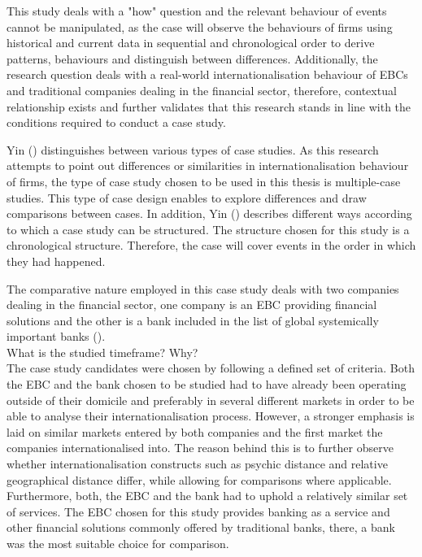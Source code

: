 \documentclass[11pt,a4paper]{article}
\begin{document}
{{This study deals with a "how" question and the relevant behaviour of events cannot be manipulated, as the case will observe the behaviours of firms using historical and current data in sequential and chronological order to derive patterns, behaviours and distinguish between differences. Additionally, the research question deals with a real-world internationalisation behaviour of EBCs and traditional companies dealing in the financial sector, therefore, contextual relationship exists and further validates that this research stands in line with the conditions required to conduct a case study. \par
Yin (\citeyear{yinCaseStudyResearch2017}) distinguishes between various types of case studies. As this research attempts to point out differences or similarities in internationalisation behaviour of firms, the type of case study chosen to be used in this thesis is multiple-case studies. This type of case design enables to explore differences and draw comparisons between cases. In addition, Yin (\citeyear{yinCaseStudyResearch2017}) describes different ways according to which a case study can be structured. The structure chosen for this study is a chronological structure. Therefore, the case will cover events in the order in which they had happened.  \par
The comparative nature employed in this case study deals with two companies dealing in the financial sector, one company is an EBC providing financial solutions and the other is a bank included in the list of global systemically important banks (\cite{2019ListGlobal2019}).  \\
What is the studied timeframe? Why?\\ %
The case study candidates were chosen by following a defined set of criteria. Both the EBC and the bank chosen to be studied had to have already been operating outside of their domicile and preferably in several different markets in order to be able to analyse their internationalisation process.  However, a stronger emphasis is laid on similar markets entered by both companies and the first market the companies internationalised into. The reason behind this is to further observe whether internationalisation constructs such as psychic distance and relative geographical distance differ, while allowing for comparisons where applicable. Furthermore, both, the EBC and the bank had to uphold a relatively similar set of services. The EBC chosen for this study provides banking as a service and other financial solutions commonly offered by traditional banks, there, a bank was the most suitable choice for comparison. 

}}
\end{document}
